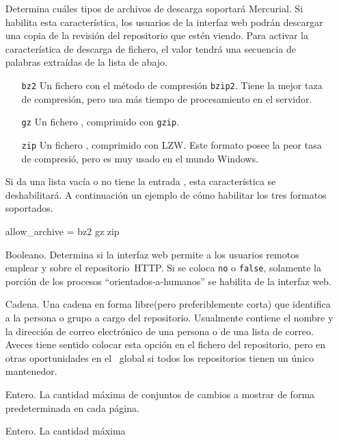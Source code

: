 \begin{itemize}
\item[\rcitem{web}{allow\_archive}] Determina cuáles tipos de archivos
  de descarga soportará Mercurial.  Si habilita esta característica,
  los usuarios de la interfaz web podrán descargar una copia de la
  revisión del repositorio que estén viendo. Para activar la
  característica de descarga de fichero, el valor tendrá una secuencia
  de palabras extraídas de la lista de abajo.
  \begin{itemize}
  \item[\texttt{bz2}] Un fichero  con el método de
    compresión \texttt{bzip2}.  Tiene la mejor taza de compresión,
    pero usa más tiempo de procesamiento en el servidor.
  \item[\texttt{gz}] Un fichero , comprimido con
    \texttt{gzip}.
  \item[\texttt{zip}] Un fichero , comprimido con LZW.
    Este formato posee la peor tasa de compresió, pero es muy usado en
    el mundo Windows.
  \end{itemize}
  Si da una lista vacía o no tiene la entrada
  , esta característica se deshabilitará.
  A continuación un ejemplo de cómo habilitar los tres formatos soportados.
  \begin{codesample4}
    [web]
    allow_archive = bz2 gz zip
  \end{codesample4}
\item[\rcitem{web}{allowpull}] Booleano.  Determina si la interfaz web
  permite a los usuarios remotos emplear  y 
  sobre el repositorio~HTTP.  Si se coloca \texttt{no} o
  \texttt{false}, solamente la porción de los procesos
  ``orientados-a-humanos'' se habilita de la interfaz web.
\item[\rcitem{web}{contact}] Cadena.  Una cadena en forma libre(pero
  preferiblemente corta) que identifica a la persona o grupo a cargo
  del repositorio.  Usualmente contiene el nombre y la dirección de
  correo electrónico de una persona o de una lista de correo.  Aveces
  tiene sentido colocar esta opción en el fichero 
  del repositorio, pero en otras oportunidades en el \hgrc\ global si
  todos los repositorios tienen un único mantenedor.
\item[\rcitem{web}{maxchanges}] Entero.  La cantidad máxima de
  conjuntos de cambios a mostrar de forma predeterminada en cada página.
\item[\rcitem{web}{maxfiles}] Entero.  La cantidad máxima

\end{itemize}
